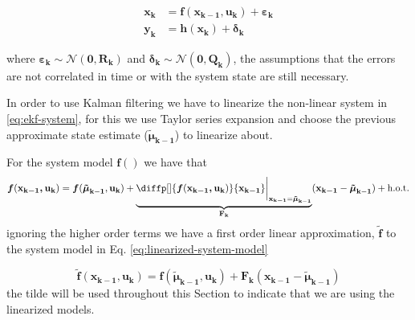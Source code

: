\documentclass[12pt]{article}
\newcommand{\bvec}[1]{\boldsymbol{\mathbf{#1}}} %
\newcommand{\mat}[1]{\boldsymbol{\mathbf{#1}}}
\newcommand{\parentheses}[1]{\left(#1\right)}
\newcommand{\mb}[1]{{\boldsymbol{#1}}} %
\newcommand{\normal}[2]{\mathcal{N}\parentheses{#1, #2}}
\newcommand{\hot}{\text{h.o.t.}}
\begin{document}
\begin{equation}
\begin{aligned}
    \bvec{x_k} &= \mb{f}(\bvec{x_{k-1}, u_k}) + \mb{\varepsilon}_\mathbf{k} \\
    \bvec{y_k} &= \mb{h}(\bvec{x_{k}}) + \mb{\delta}_\mathbf{k}
\end{aligned}
    \label{eq:ekf-system}
\end{equation}

where $\mb{\varepsilon}_\mathbf{k} \sim \normal{\bvec{0}}{\bvec{R_k}}$ and $\mb{\delta}_\mathbf{k} \sim \normal{\bvec{0}}{\bvec{Q_k}}$, the assumptions that the errors are not correlated in time or with the system state are still necessary.

In order to use Kalman filtering we have to linearize the non-linear system in \ref{eq:ekf-system}, for this we use Taylor series expansion and choose the previous approximate state estimate ($\mb{\tilde{\mu}}_\mathbf{k-1}$) to linearize about.

For the system model $\mb{f}()$ we have that
\begin{equation*}
    \mb{f}(\bvec{x_{k-1}, u_k}) = \mb{f}(\mb{\tilde{\mu}}_\mathbf{k-1}, \bvec{u_k}) + \underbrace{\diffp[]{\mb{f}(\bvec{x_{k-1}, u_k}) }{\bvec{x_{k-1}}}\bigg\rvert_{\bvec{x_{k-1}} = \mb{\tilde{\mu}}_\mathbf{k-1}}}_{\mat{F_k}} (\bvec{x_{k-1}} - \mb{\tilde{\mu}}_\mathbf{k-1}) + \hot
\end{equation*}
ignoring the higher order terms we have a first order linear approximation, $\mb{\tilde{f}}$ to the system model in Eq. \ref{eq:linearized-system-model}

\begin{equation}
    \mb{\tilde{f}}(\bvec{x_{k-1}, u_k}) = \mb{f}(\mb{\tilde{\mu}}_\mathbf{k-1}, \bvec{u_k}) + \mat{F_k} (\bvec{x_{k-1}} - \mb{\tilde{\mu}}_\mathbf{k-1})
    \label{eq:linearized-system-model}
\end{equation}
the tilde will be used throughout this Section to indicate that we are using the linearized models.
\end{document}
